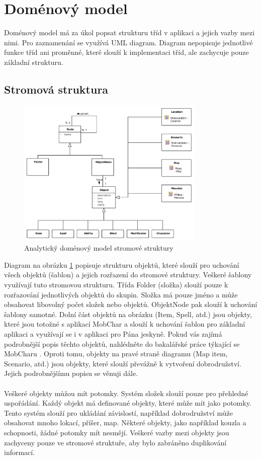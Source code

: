 \documentclass[thesis=B,czech]{resources/FITthesis}[2012/06/26]
\begin{document}
	\section{Doménový model}
Doménový model má za úkol popsat strukturu tříd v aplikaci a jejich vazby mezi nimi. Pro zaznamenání se využívá UML diagram. Diagram nepopisuje jednotlivé funkce tříd ani proměnné, které slouží k implementaci tříd, ale zachycuje pouze základní strukturu.
\subsection{Stromová struktura}
\begin{figure}\centering
	\includegraphics[width=0.8\textwidth]{images/domain_struktura}
	\caption[Analytický doménový model stromové struktury]{Analytický doménový model stromové struktury}\label{fig:dm_stromova_struktura}
\end{figure}
Diagram na obrázku \ref{fig:dm_stromova_struktura} popisuje strukturu objektů, které slouží pro uchování všech objektů (šablon) a jejich rozřazení do stromové struktury. Veškeré šablony využívají tuto stromovou strukturu. Třída Folder (složka) slouží pouze k rozřazování jednotlivých objektů do skupin. Složka má pouze jméno a může obsahovat libovolný počet složek nebo objektů. ObjektNode pak slouží k uchování šablony samotné. Dolní část objektů na obrázku (Item, Spell, atd.) jsou objekty, které jsou totožné s aplikací MobChar a slouží k uchování šablon pro základní aplikaci a využívají se i v aplikaci pro Pána jeskyně. Pokud vás zajímá podrobnější popis těchto objektů, nahlédněte do bakalářské práce týkající se MobCharu \cite{Weberova_2017}. Oproti tomu, objekty na pravé straně diagramu (Map item, Scenario, atd.) jsou objekty, které slouží převážně k vytvoření dobrodružství. Jejich podrobnějšímu popisu se věnuji dále.\\
\\
Veškeré objekty můžou mít potomky. Systém složek slouží pouze pro přehledné uspořádání. Každý objekt má definované objekty, které může mít jako potomky. Tento systém slouží pro ukládání závislostí, například dobrodružství může obsahovat mnoho lokací, příšer, map. Některé objekty, jako například kouzla a schopnosti, žádné potomky mít nesmějí. Veškeré vazby mezi objekty jsou zachyceny pouze ve stromové struktuře, aby bylo zabráněno duplikování informací.
\end{document}
